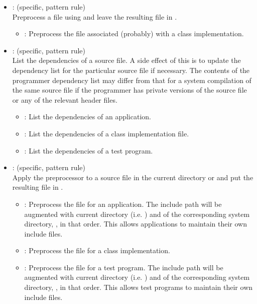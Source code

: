 \begin{itemize}
\item
    : (specific, pattern rule)
   \\ Preprocess a  file using  and leave the
   resulting  file in .
   \begin{itemize}
   \item
      : Preprocess the  file associated (probably) with a
      class implementation.
   \end{itemize}

\item
    : (specific, pattern rule)
   \\ List the dependencies of a source file.  A side effect of this is to
   update the dependency list for the particular source file if necessary.
   The contents of the programmer dependency list may differ from that for a
   system compilation of the same source file if the programmer has private
   versions of the source file or any of the relevant header files.
   \begin{itemize}
   \item
      : List the dependencies of an application.
   \item
      : List the dependencies of a class implementation file.
   \item
      : List the dependencies of a test program.
   \end{itemize}

\item
    : (specific, pattern rule)
   \\ Apply the  preprocessor  to a source file in the
   current directory or  and put the resulting 
   file in .
   \begin{itemize}
   \item
      : Preprocess the  file for an application.  The
      include path will be augmented with current directory (i.e. )
      and of the corresponding system directory, , in that
      order.  This allows applications to maintain their own include files.
   \item
      : Preprocess the  file for a class implementation.
   \item
      : Preprocess the  file for a test program.  The
      include path will be augmented with current directory (i.e. )
      and of the corresponding system directory, , in that
      order.  This allows test programs to maintain their own include files.
   \end{itemize}


\end{itemize}
